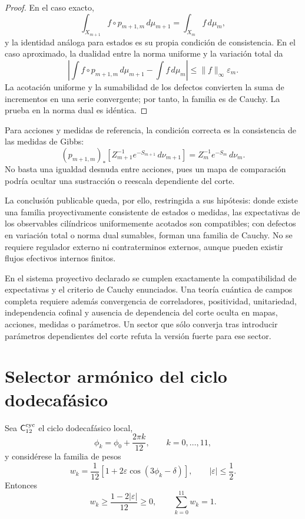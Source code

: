 \begin{proof}
En el caso exacto,
\[
 \int_{X_{m+1}}f\circ p_{m+1,m}\,d\mu_{m+1}
 =\int_{X_m}f\,d\mu_m,
\]
y la identidad análoga para estados es su propia condición de consistencia.
En el caso aproximado, la dualidad entre la norma uniforme y la variación
total da
\[
 \left|
 \int f\circ p_{m+1,m}\,d\mu_{m+1}
 -\int f\,d\mu_m
 \right|
 \leq \|f\|_\infty\varepsilon_m.
\]
La acotación uniforme y la sumabilidad de los defectos convierten la suma de
incrementos en una serie convergente; por tanto, la familia es de Cauchy. La
prueba en la norma dual es idéntica.
\end{proof}

Para acciones y medidas de referencia, la condición correcta es la
consistencia de las medidas de Gibbs:
\[
 (p_{m+1,m})_\ast
 \left[
 Z_{m+1}^{-1}e^{-S_{m+1}}\,d\nu_{m+1}
 \right]
 =
 Z_m^{-1}e^{-S_m}\,d\nu_m.
\]
No basta una igualdad desnuda entre acciones, pues un mapa de comparación
podría ocultar una sustracción o reescala dependiente del corte.

La conclusión publicable queda, por ello, restringida a sus hipótesis:
donde existe una familia proyectivamente consistente de estados o medidas,
las expectativas de los observables cilíndricos uniformemente acotados son
compatibles; con defectos en variación total o norma dual sumables, forman
una familia de Cauchy. No se requiere regulador externo ni contraterminos
externos, aunque pueden existir flujos efectivos internos finitos.

En el sistema proyectivo declarado se cumplen exactamente la compatibilidad
de expectativas y el criterio de Cauchy enunciados. Una teoría cuántica de
campos completa requiere además
convergencia de correladores, positividad, unitariedad, independencia
cofinal y ausencia de dependencia del corte oculta en mapas, acciones,
medidas o parámetros. Un sector que sólo converja tras introducir parámetros
dependientes del corte refuta la versión fuerte para ese sector.

\section{Selector armónico del ciclo dodecafásico}
\label{sec:selector-armonico-c12}

Sea \(\mathsf C_{12}^{\rm cyc}\) el ciclo dodecafásico local,
\[
 \phi_k=\phi_0+\frac{2\pi k}{12},
 \qquad k=0,\ldots,11,
\]
y considérese la familia de pesos
\[
 w_k=\frac1{12}
 \left[1+2\varepsilon\cos(3\phi_k-\delta)\right],
 \qquad |\varepsilon|\leq\frac12.
\]
Entonces
\[
 w_k\geq\frac{1-2|\varepsilon|}{12}\geq0,
 \qquad
 \sum_{k=0}^{11}w_k=1.
\]

